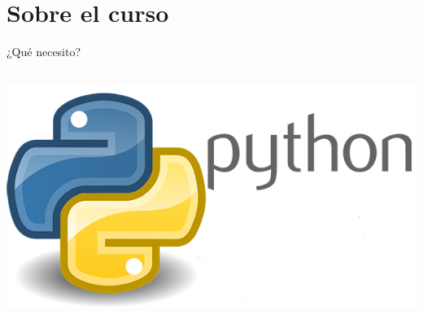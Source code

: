 \documentclass[bigger,unknownkeysallowed]{beamer}
\begin{document}
\section{Sobre el curso}
\label{sec:org98aad8c}


\begin{frame}[label={sec:orge76284a}]{¿Qué necesito?}
\begin{columns}
\begin{column}{0.3\columnwidth}
\begin{center}
\begin{center}
\includegraphics[width=.8\textwidth]{python_logo.png}
\end{center}
\end{center}
\end{column}



\end{columns}
\end{frame}
\end{document}
